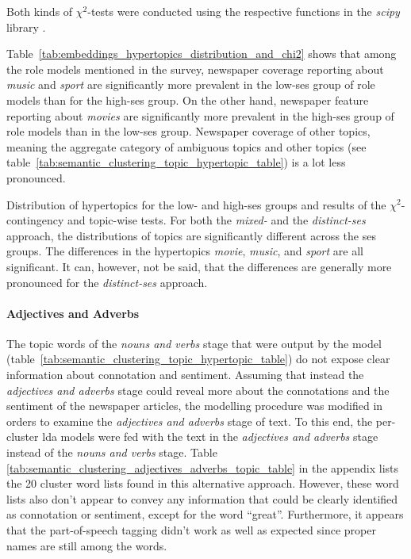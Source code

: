 Both kinds of $\chi^2$-tests were conducted using the respective functions in the \textit{scipy} library \autocite{scipychi2_scipy_nodate,scipychi2_contingency_scipy_nodate}.

Table~\ref{tab:embeddings_hypertopics_distribution_and_chi2} shows that among the role models mentioned in the survey, newspaper coverage reporting about \textit{music} and \textit{sport} are significantly more prevalent in the low-\gls{ses} group of role models than for the high-\gls{ses} group. On the other hand, newspaper feature reporting about \textit{movies} are significantly more prevalent in the high-\gls{ses} group of role models than in the low-\gls{ses} group. Newspaper coverage of other topics, meaning the aggregate category of ambiguous topics and other topics (see table~\ref{tab:semantic_clustering_topic_hypertopic_table}) is a lot less pronounced.

\begin{table}
    \centering
    
    \caption{Distribution of hypertopics for the low- and high-\gls{ses} groups and results of the $\chi^2$-contingency and topic-wise tests. For both the \textit{mixed-} and the \textit{distinct-\gls{ses}} approach, the distributions of topics are significantly different across the \gls{ses} groups. The differences in the hypertopics \textit{movie}, \textit{music}, and \textit{sport} are all significant. It can, however, not be said, that the differences are generally more pronounced for the \textit{distinct-\gls{ses}} approach.}\label{tab:embeddings_hypertopics_distribution_and_chi2}
\end{table}

\paragraph{Adjectives and Adverbs}
The topic words of the \textit{nouns and verbs} stage that were output by the model (table~\ref{tab:semantic_clustering_topic_hypertopic_table}) do not expose clear information about connotation and sentiment. Assuming that instead the \textit{adjectives and adverbs} stage could reveal more about the connotations and the sentiment of the newspaper articles, the modelling procedure was modified in orders to examine the \textit{adjectives and adverbs} stage of text. To this end, the per-cluster \gls{lda} models were fed with the text in the \textit{adjectives and adverbs} stage instead of the \textit{nouns and verbs} stage. Table \ref{tab:semantic_clustering_adjectives_adverbs_topic_table} in the appendix lists the \SI{20}{} cluster word lists found in this alternative approach. However, these word lists also don't appear to convey any information that could be clearly identified as connotation or sentiment, except for the word ``great''. Furthermore, it appears that the part-of-speech tagging didn't work as well as expected since proper names are still among the words.


